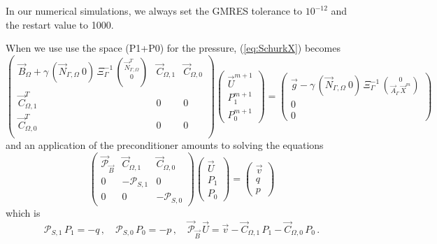 \documentclass[a4paper,12pt,onecolumn]{article}
\newcommand{\NbulkT}{\vec{N}_{\Gamma,\Omega}^T}
\newcommand{\Nbulk}{\vec{N}_{\Gamma,\Omega}}
\begin{document}
In our numerical simulations, we always set the GMRES tolerance to $10^{-12}$ and the restart value to 1000.

When we use use the space (P1+P0) for the pressure, (\ref{eq:SchurkX}) becomes 
\begin{subequations}
\begin{equation} \label{eq:SchurkXP1P0}
\begin{pmatrix}
\vec B_\Omega + \gamma\,(\Nbulk \ 0)\,\Xi_\Gamma^{-1}\,\binom{\NbulkT}{0} & \vec C_{\Omega,1} & \vec C_{\Omega,0} \\
\vec C^T_{\Omega,1} & 0 & 0 \\
\vec C^T_{\Omega,0} & 0 & 0 \\
\end{pmatrix}
\begin{pmatrix}
\vec U^{m+1} \\ 
P^{m+1}_1 \\ 
P^{m+1}_0
\end{pmatrix}
= \begin{pmatrix}
\vec g-\gamma\,(\Nbulk \ 0)\, \Xi_\Gamma^{-1}\,\binom{0}{\vec{A}_\Gamma\,\vec{X}^{m}} \\
0 \\
0
\end{pmatrix}
\end{equation}
\end{subequations}
and an application of the preconditioner amounts to solving the equations
\begin{equation*} 
\begin{pmatrix}
\vec{\mathcal{P}}_{\vec B} & \vec C_{\Omega,1} & \vec C_{\Omega,0} \\
0 & -\mathcal{P}_{S,1} & 0 \\
0 & 0 &-\mathcal{P}_{S,0}
\end{pmatrix}
\begin{pmatrix} 
\vec U \\ 
P_1 \\
P_0
\end{pmatrix}
= 
\begin{pmatrix} 
\vec v \\ 
q \\
p
\end{pmatrix}
\end{equation*}
which is
\begin{equation*}
\mathcal{P}_{S,1}\,P_1 = -q\,,\quad \mathcal{P}_{S,0}\,P_0 = -p\,,\quad \vec{\mathcal{P}}_{\vec B}\,\vec U = \vec v - \vec C_{\Omega,1}\,P_1 - \vec C_{\Omega,0}\,P_0\,.
\end{equation*}
\end{document}
